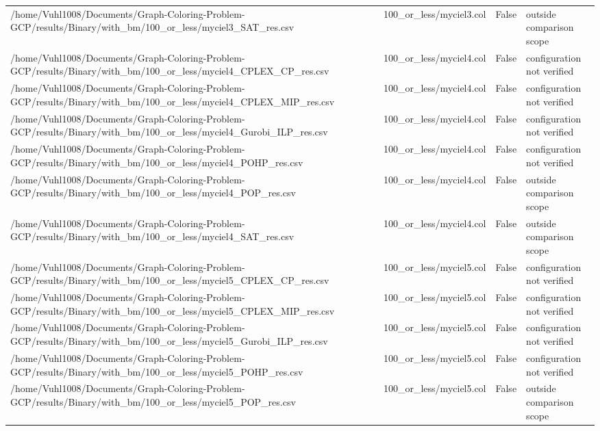 \begin{table}[htbp]
\begin{tabular}{llll}
/home/Vuhl1008/Documents/Graph-Coloring-Problem-GCP/results/Binary/with\_bm/100\_or\_less/myciel3\_SAT\_res.csv & 100\_or\_less/myciel3.col & False & outside comparison scope \\
/home/Vuhl1008/Documents/Graph-Coloring-Problem-GCP/results/Binary/with\_bm/100\_or\_less/myciel4\_CPLEX\_CP\_res.csv & 100\_or\_less/myciel4.col & False & configuration not verified \\
/home/Vuhl1008/Documents/Graph-Coloring-Problem-GCP/results/Binary/with\_bm/100\_or\_less/myciel4\_CPLEX\_MIP\_res.csv & 100\_or\_less/myciel4.col & False & configuration not verified \\
/home/Vuhl1008/Documents/Graph-Coloring-Problem-GCP/results/Binary/with\_bm/100\_or\_less/myciel4\_Gurobi\_ILP\_res.csv & 100\_or\_less/myciel4.col & False & configuration not verified \\
/home/Vuhl1008/Documents/Graph-Coloring-Problem-GCP/results/Binary/with\_bm/100\_or\_less/myciel4\_POHP\_res.csv & 100\_or\_less/myciel4.col & False & configuration not verified \\
/home/Vuhl1008/Documents/Graph-Coloring-Problem-GCP/results/Binary/with\_bm/100\_or\_less/myciel4\_POP\_res.csv & 100\_or\_less/myciel4.col & False & outside comparison scope \\
/home/Vuhl1008/Documents/Graph-Coloring-Problem-GCP/results/Binary/with\_bm/100\_or\_less/myciel4\_SAT\_res.csv & 100\_or\_less/myciel4.col & False & outside comparison scope \\
/home/Vuhl1008/Documents/Graph-Coloring-Problem-GCP/results/Binary/with\_bm/100\_or\_less/myciel5\_CPLEX\_CP\_res.csv & 100\_or\_less/myciel5.col & False & configuration not verified \\
/home/Vuhl1008/Documents/Graph-Coloring-Problem-GCP/results/Binary/with\_bm/100\_or\_less/myciel5\_CPLEX\_MIP\_res.csv & 100\_or\_less/myciel5.col & False & configuration not verified \\
/home/Vuhl1008/Documents/Graph-Coloring-Problem-GCP/results/Binary/with\_bm/100\_or\_less/myciel5\_Gurobi\_ILP\_res.csv & 100\_or\_less/myciel5.col & False & configuration not verified \\
/home/Vuhl1008/Documents/Graph-Coloring-Problem-GCP/results/Binary/with\_bm/100\_or\_less/myciel5\_POHP\_res.csv & 100\_or\_less/myciel5.col & False & configuration not verified \\
/home/Vuhl1008/Documents/Graph-Coloring-Problem-GCP/results/Binary/with\_bm/100\_or\_less/myciel5\_POP\_res.csv & 100\_or\_less/myciel5.col & False & outside comparison scope \\

\end{tabular}
\end{table}
